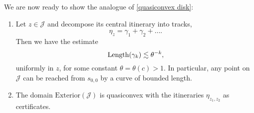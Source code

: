 We are now ready to show the analogue of \cref{quasiconvex disk}:
\begin{theorem}  \leavevmode
\begin{enumerate}[label=\normalfont(\roman*)]

\item Let $z\in\mathcal{J}$ and decompose its central itinerary into tracks, 
\begin{equation*}
\eta_z = \gamma _1 +\gamma_2 +\dots.
\end{equation*}
Then we have the estimate
\begin{equation*}
\operatorname{Length}(\gamma_{k})\lesssim\theta^{-k},
\end{equation*}
uniformly in $z$, for some constant $\theta=\theta(c)>1$. In particular, any point on \(\mathcal{J}\) can be reached from $s_{0,0}$ by a curve of bounded length.

\item The domain $\mathrm{Exterior}(\mathcal{J})$ is quasiconvex with the itineraries $\eta_{z_1,z_2}$ as certificates.
	\end{enumerate}
\end{theorem}

